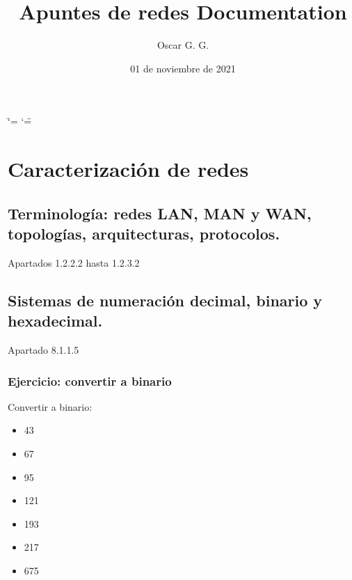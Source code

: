 \documentclass[letterpaper,10pt,spanish]{sphinxmanual}
\title{Apuntes de redes Documentation}
\date{01 de noviembre de 2021}
\author{Oscar G. G.}
\begin{document}
\ifdefined\shorthandoff
  \ifnum\catcode`\=\string=\active\shorthandoff{=}\fi
  \ifnum\catcode`\"=\active{}\fi
\fi

\pagestyle{empty}
\sphinxmaketitle
\pagestyle{plain}
\sphinxtableofcontents
\pagestyle{normal}
\label{\detokenize{index::doc}}



\chapter{Caracterización de redes}
\label{\detokenize{t1_caracterizacion_redes/apuntes_t1:caracterizacion-de-redes}}\label{\detokenize{t1_caracterizacion_redes/apuntes_t1::doc}}

\section{Terminología: redes LAN, MAN y WAN, topologías, arquitecturas, protocolos.}
\label{\detokenize{t1_caracterizacion_redes/apuntes_t1:terminologia-redes-lan-man-y-wan-topologias-arquitecturas-protocolos}}
Apartados 1.2.2.2 hasta 1.2.3.2


\section{Sistemas de numeración decimal, binario y hexadecimal.}
\label{\detokenize{t1_caracterizacion_redes/apuntes_t1:sistemas-de-numeracion-decimal-binario-y-hexadecimal}}
Apartado 8.1.1.5


\subsection{Ejercicio: convertir a binario}
\label{\detokenize{t1_caracterizacion_redes/apuntes_t1:ejercicio-convertir-a-binario}}
Convertir a binario:
\begin{itemize}
\item {} 
43

\item {} 
67

\item {} 
95

\item {} 
121

\item {} 
193

\item {} 
217

\item {} 
675

\end{itemize}
\end{document}
